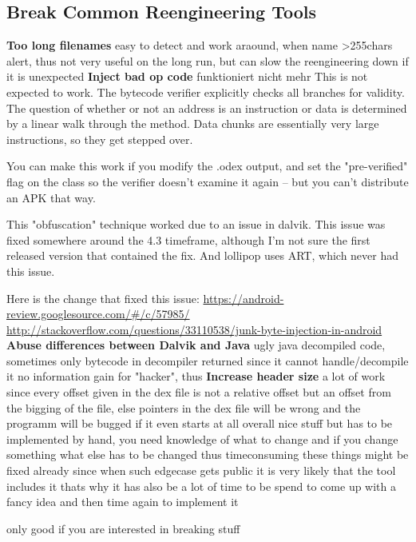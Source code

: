 \subsection{Break Common Reengineering Tools}
\label{subsection:evaluation-reengineering-break}
\newline
\newline
\textbf{Too long filenames} \newline
easy to detect and work araound, when name >255chars alert, thus not very useful on the long run, but can slow the reengineering down if it is unexpected
\newline
\newline
\textbf{Inject bad op code} \newline
funktioniert nicht mehr
This is not expected to work. The bytecode verifier explicitly checks all branches for validity. The question of whether or not an address is an instruction or data is determined by a linear walk through the method. Data chunks are essentially very large instructions, so they get stepped over.

You can make this work if you modify the .odex output, and set the "pre-verified" flag on the class so the verifier doesn't examine it again -- but you can't distribute an APK that way.

This "obfuscation" technique worked due to an issue in dalvik. This issue was fixed somewhere around the 4.3 timeframe, although I'm not sure the first released version that contained the fix. And lollipop uses ART, which never had this issue.

Here is the change that fixed this issue: \url{https://android-review.googlesource.com/#/c/57985/}
\url{http://stackoverflow.com/questions/33110538/junk-byte-injection-in-android}
%
\newline
\newline
\textbf{Abuse differences between Dalvik and Java} \newline
ugly java decompiled code, sometimes only bytecode in decompiler returned since it cannot handle/decompile it
no information gain for "hacker", thus
\newline
\newline
\textbf{Increase header size} \newline
a lot of work since every offset given in the dex file is not a relative offset but an offset from the bigging of the file, else pointers in the dex file will be wrong and the programm will be bugged if it even starts at all
overall nice stuff but has to be implemented by hand, you need knowledge of what to change and if you change something what else has to be changed thus timeconsuming
these things might be fixed already since when such edgecase gets public it is very likely that the tool includes it thats why it has also be a lot of time to be spend to come up with a fancy idea and then time again to implement it

only good if you are interested in breaking stuff
